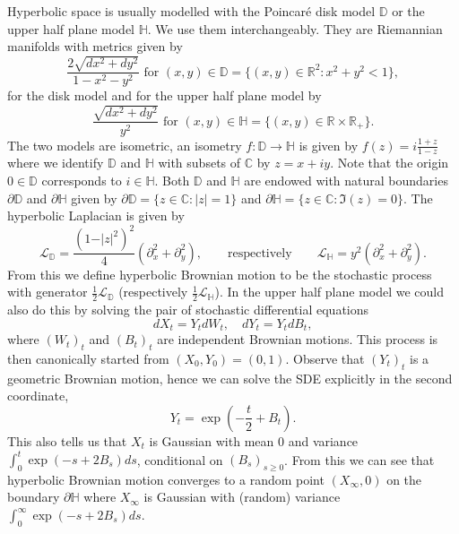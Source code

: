 \documentclass{article}
\theoremstyle{definition}
\numberwithin{equation}{section}
\numberwithin{thm}{section}
\newcommand*{\CC}{\ensuremath{\mathbb{C}}} 		        %
\newcommand*{\RR}{\ensuremath{\mathbb{R}}}	        	%
\newcommand*{\DD}{\ensuremath{\mathbb{D}}}	        	%
\newcommand*{\HH}{\ensuremath{\mathbb{H}}}	        	%
\begin{document}
Hyperbolic space is usually modelled with the Poincaré disk model $\DD$ or the upper half plane model $\HH$. We use them interchangeably. They are Riemannian manifolds with metrics given by 
\begin{equation*}
    \frac{2 \sqrt{dx^2+dy^2}}{1-x^2-y^2} 
    \text{ for }(x,y)\in \DD=\{(x,y)\in \RR^2: x^2+y^2<1\},
\end{equation*}
for the disk model and for the upper half plane model by
\begin{equation*}
    \frac{\sqrt{dx^2 + dy^2}}{y^2} \text{ for }(x,y)\in \HH=\{(x,y)\in \RR \times \RR_+\}.
\end{equation*}
The two models are isometric, an isometry $f:\DD \to \HH$ is given by $f(z)=i\frac{1+z}{1-z}$ where we identify $\DD$ and $\HH$ with subsets of $\CC$ by $z=x+iy$. Note that the origin $0\in \DD$ corresponds to $i \in \HH$. Both $\DD$ and $\HH$ are endowed with natural boundaries $\partial \DD$ and $\partial \HH$ given by $\partial\DD=\{z\in \CC: \vert z\vert =1\}$ and $\partial \HH=\{z\in \CC: \Im(z)=0\}$.
The hyperbolic Laplacian is given by 
\begin{equation*}
    \mathcal{L}_\DD = \frac{(1-\vert z\vert^2)^2}{4}\left( \partial_x^2 + \partial_y^2\right), \qquad \text{respectively} \qquad \mathcal{L}_\HH = y^2\left( \partial_x^2 + \partial_y^2\right).
\end{equation*}
From this we define hyperbolic Brownian motion to be the stochastic process with generator $\frac{1}{2}\mathcal{L}_\DD$ (respectively $\frac{1}{2}\mathcal{L}_\HH$). In the upper half plane model we could also do this by solving the pair of stochastic differential equations
\begin{equation*}%
    dX_t = Y_t dW_t, \quad dY_t =Y_tdB_t,
\end{equation*}
where $(W_t)_t$ and $(B_t)_t$ are independent Brownian motions. This process is then canonically started from $(X_0, Y_0)=(0,1)$. Observe that $(Y_t)_t$ is a geometric Brownian motion, hence we can solve the SDE explicitly in the second coordinate,
\begin{equation*}%
    Y_t = \exp\left( -\frac{t}{2} + B_t\right).
\end{equation*}
This also tells us that $X_t$ is Gaussian with mean $0$ and variance $\int_0^t \exp\left( -s + 2B_s\right) ds$, conditional on $(B_s)_{s\geq 0}$. From this we can see that hyperbolic Brownian motion converges to a random point $(X_\infty,0)$ on the boundary $\partial \HH$ where $X_\infty$ is Gaussian with (random) variance $\int_0^\infty \exp\left( -s + 2B_s\right) ds$.
\end{document}
